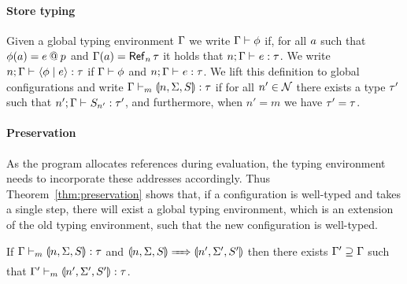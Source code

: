 \paragraph{Store typing}
Given a global typing environment $\Gamma$ we write $\Gamma \vdash \phi$ if, for all $a$ such that $\phi(a) = e \mathbin{@} p$ and $\tenv(\addr) = \reftype[n]{\type}$ it holds that $\hastype{n; \tenv}{\expr}{\type}$. We write $\hastype{n; \tenv}{\config{\store}{\expr}}{\type}$ if $\Gamma \vdash \phi$ and $\hastype{n; \tenv}{\expr}{\type}$. We lift this definition to global configurations and write $\hastype[m]{\tenv}{\gconfig{n}{\env}{S}}{\type}$ if for all $n' \in \mathcal{N}$ there exists a type $\tau'$ such that $\hastype{n'; \tenv}{S_{n'}}{\type'}$, and furthermore, when $n' = m$ we have $\tau' = \tau$.

\paragraph{Preservation}
As the program allocates references during evaluation, the typing environment needs to incorporate these addresses accordingly. Thus Theorem~\ref{thm:preservation} shows that, if a configuration is well-typed and takes a single step, there will exist a global typing environment, which is an extension of the old typing environment, such that the new configuration is well-typed.

\begin{theorem}[Preservation]\label{thm:preservation}
If $\hastype[m]{\tenv}{\gconfig{n}{\env}{S}}{\type}$ and $\gconfig{n}{\env}{S} \gstepsto \gconfig{n'}{\env'}{S'}$ then there exists $\Gamma' \supseteq \Gamma$ such that $\hastype[m]{\tenv'}{\gconfig{n'}{\env'}{S'}}{\type}$.
\end{theorem}

